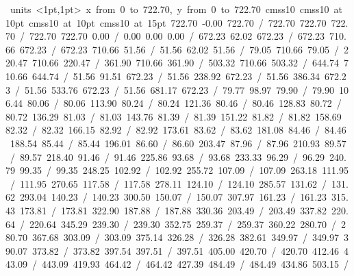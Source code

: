 \hbox{\beginpicture
\setcoordinatesystem units <1pt,1pt>
\setplotarea x from 0 to 722.70, y from 0 to 722.70
\setlinear
\font\picfont cmss10\picfont
\font\picfont cmss10 at 10pt\picfont
\font\picfont cmss10 at 10pt\picfont
\font\picfont cmss10 at 15pt\picfont
\setsolid
{} 722.70 -0.00 722.70 /
 722.70 722.70 722.70 /
 722.70 722.70 0.00 /
 0.00 0.00 0.00 /
\setsolid
{} 672.23 62.02 672.23 /
 672.23 710.66 672.23 /
 672.23 710.66 51.56 /
 51.56 62.02 51.56 /
\setsolid
{} 79.05 710.66 79.05 /
\setsolid
{} 220.47 710.66 220.47 /
\setsolid
{} 361.90 710.66 361.90 /
\setsolid
{} 503.32 710.66 503.32 /
\setsolid
{} 644.74 710.66 644.74 /
\setsolid
{} 51.56 91.51 672.23 /
\setsolid
{} 51.56 238.92 672.23 /
\setsolid
{} 51.56 386.34 672.23 /
\setsolid
{} 51.56 533.76 672.23 /
\setsolid
{} 51.56 681.17 672.23 /
\setsolid
{} 79.77 98.97 79.90 /
 79.90 106.44 80.06 /
 80.06 113.90 80.24 /
 80.24 121.36 80.46 /
 80.46 128.83 80.72 /
 80.72 136.29 81.03 /
 81.03 143.76 81.39 /
 81.39 151.22 81.82 /
 81.82 158.69 82.32 /
 82.32 166.15 82.92 /
 82.92 173.61 83.62 /
 83.62 181.08 84.46 /
 84.46 188.54 85.44 /
 85.44 196.01 86.60 /
 86.60 203.47 87.96 /
 87.96 210.93 89.57 /
 89.57 218.40 91.46 /
 91.46 225.86 93.68 /
 93.68 233.33 96.29 /
 96.29 240.79 99.35 /
 99.35 248.25 102.92 /
 102.92 255.72 107.09 /
 107.09 263.18 111.95 /
 111.95 270.65 117.58 /
 117.58 278.11 124.10 /
 124.10 285.57 131.62 /
 131.62 293.04 140.23 /
 140.23 300.50 150.07 /
 150.07 307.97 161.23 /
 161.23 315.43 173.81 /
 173.81 322.90 187.88 /
 187.88 330.36 203.49 /
 203.49 337.82 220.64 /
 220.64 345.29 239.30 /
 239.30 352.75 259.37 /
 259.37 360.22 280.70 /
 280.70 367.68 303.09 /
 303.09 375.14 326.28 /
 326.28 382.61 349.97 /
 349.97 390.07 373.82 /
 373.82 397.54 397.51 /
 397.51 405.00 420.70 /
 420.70 412.46 443.09 /
 443.09 419.93 464.42 /
 464.42 427.39 484.49 /
 484.49 434.86 503.15 /
}
